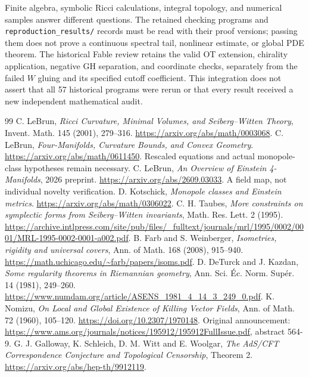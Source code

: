 \documentclass[11pt]{article}
\theoremstyle{definition}\newtheorem{problem}[theorem]{Open problem}
\theoremstyle{remark}\newtheorem{remark}[theorem]{Scope}
\numberwithin{equation}{section}
\begin{document}
Finite algebra, symbolic Ricci calculations, integral topology, and numerical samples answer different questions. The retained checking programs and \nolinkurl{reproduction_results/} records must be read with their proof versions; passing them does not prove a continuous spectral tail, nonlinear estimate, or global PDE theorem. The historical Fable review retains the valid OT extension, chirality application, negative GH separation, and coordinate checks, separately from the failed $W$ gluing and its specified cutoff coefficient. This integration does not assert that all 57 historical programs were rerun or that every result received a new independent mathematical audit.

\begin{thebibliography}{99}
 C. LeBrun, \emph{Ricci Curvature, Minimal Volumes, and Seiberg--Witten Theory}, Invent. Math. 145 (2001), 279--316. \url{https://arxiv.org/abs/math/0003068}.
 C. LeBrun, \emph{Four-Manifolds, Curvature Bounds, and Convex Geometry}. \url{https://arxiv.org/abs/math/0611450}. Rescaled equations and actual monopole-class hypotheses remain necessary.
 C. LeBrun, \emph{An Overview of Einstein 4-Manifolds}, 2026 preprint. \url{https://arxiv.org/abs/2609.03033}. A field map, not individual novelty verification.
 D. Kotschick, \emph{Monopole classes and Einstein metrics}. \url{https://arxiv.org/abs/math/0306022}.
 C. H. Taubes, \emph{More constraints on symplectic forms from Seiberg--Witten invariants}, Math. Res. Lett. 2 (1995). \url{https://archive.intlpress.com/site/pub/files/_fulltext/journals/mrl/1995/0002/0001/MRL-1995-0002-0001-a002.pdf}.
 B. Farb and S. Weinberger, \emph{Isometries, rigidity and universal covers}, Ann. of Math. 168 (2008), 915--940. \url{https://math.uchicago.edu/~farb/papers/isoms.pdf}.
 D. DeTurck and J. Kazdan, \emph{Some regularity theorems in Riemannian geometry}, Ann. Sci. \'Ec. Norm. Sup\'er. 14 (1981), 249--260. \url{https://www.numdam.org/article/ASENS_1981_4_14_3_249_0.pdf}.
 K. Nomizu, \emph{On Local and Global Existence of Killing Vector Fields}, Ann. of Math. 72 (1960), 105--120. \url{https://doi.org/10.2307/1970148}. Original announcement: \url{https://www.ams.org/journals/notices/195912/195912FullIssue.pdf}, abstract 564-9.
 G. J. Galloway, K. Schleich, D. M. Witt and E. Woolgar, \emph{The AdS/CFT Correspondence Conjecture and Topological Censorship}, Theorem 2. \url{https://arxiv.org/abs/hep-th/9912119}.

\end{thebibliography}
\end{document}
